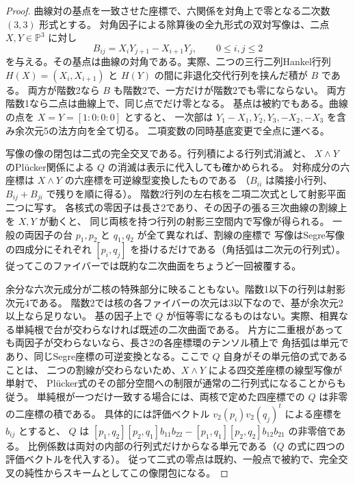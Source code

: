 \begin{proof}
曲線対の基点を一致させた座標で、六関係を対角上で零となる二次数 $(3,3)$ 形式とする。
対角因子による除算後の全九形式の双対写像は、二点 $X,Y\in\mathbb P^3$ に対し
\[
 B_{ij}=X_iY_{j+1}-X_{i+1}Y_j,\qquad 0\le i,j\le2
\]
を与える。その基点は曲線の対角である。実際、二つの三行二列Hankel行列
$H(X)=(X_i,X_{i+1})$ と $H(Y)$ の間に非退化交代行列を挟んだ積が $B$ である。
両方が階数2なら $B$ も階数2で、一方だけが階数2でも零にならない。
両方階数1なら二点は曲線上で、同じ点でだけ零となる。
基点は被約でもある。曲線の点を $X=Y=[1:0:0:0]$ とすると、
一次部は $Y_1-X_1,Y_2,Y_3,-X_2,-X_3$ を含み余次元5の法方向を全て切る。
二項変数の同時基底変更で全点に運べる。

写像の像の閉包は二式の完全交叉である。行列積による行列式消滅と、
$X\wedge Y$ のPlücker関係による $Q$ の消滅は表示に代入しても確かめられる。
対称成分の六座標は $X\wedge Y$ の六座標を可逆線型変換したものである
（$B_{ii}$ は隣接小行列、$B_{ij}+B_{ji}$ で残りを順に得る）。
階数2行列の左右核を二項二次式として射影平面二つに写す。
各核式の零因子は長さ2であり、その因子の張る三次曲線の割線上を $X,Y$ が動くと、
同じ両核を持つ行列の射影三空間内で写像が得られる。
一般の両因子の台 $p_1,p_2$ と $q_1,q_2$ が全て異なれば、割線の座標で
写像はSegre写像の四成分にそれぞれ $[p_i,q_j]$ を掛けるだけである（角括弧は二次元の行列式）。
従ってこのファイバーでは既約な二次曲面をちょうど一回被覆する。

余分な六次元成分が二核の特殊部分に映ることもない。階数1以下の行列は射影次元4である。
階数2では核の各ファイバーの次元は3以下なので、基が余次元2以上なら足りない。
基の因子上で $Q$ が恒等零になるものはない。実際、相異なる単純根で台が交わらなければ既述の二次曲面である。
片方に二重根があっても両因子が交わらないなら、長さ2の各座標環のテンソル積上で
角括弧は単元であり、同じSegre座標の可逆変換となる。ここで $Q$ 自身がその単元倍の式であることは、
二つの割線が交わらないため、$X\wedge Y$ による四交差座標の線型写像が単射で、
Plücker式のその部分空間への制限が通常の二行列式になることからも従う。
単純根が一つだけ一致する場合には、両核で定めた四座標での $Q$ は非零の二座標の積である。
具体的には評価ベクトル $v_2(p_i)v_2(q_j)^t$ による座標を $b_{ij}$ とすると、
$Q$ は $[p_1,q_2][p_2,q_1]b_{11}b_{22}-[p_1,q_1][p_2,q_2]b_{12}b_{21}$ の非零倍である。
比例係数は両対の内部の行列式だけからなる単元である（$Q$ の式に四つの評価ベクトルを代入する）。
従って二式の零点は既約、一般点で被約で、完全交叉の純性からスキームとしてこの像閉包になる。


\end{proof}
